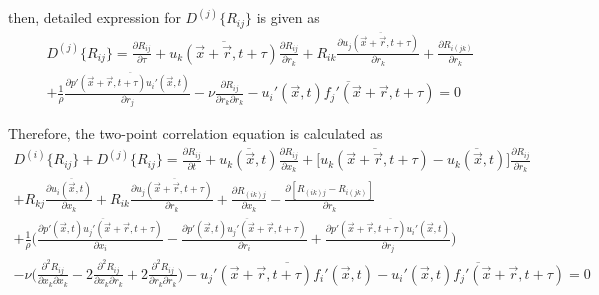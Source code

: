 \documentclass[paper=a4, fontsize=11pt]{scrartcl} %
\numberwithin{equation}{section} %
\numberwithin{figure}{section} %
\numberwithin{table}{section} %
\begin{document}
	 then, detailed expression for  $D^{(j)}\{R_{ij}\}$ is given as
	 \begin{equation}
		 \begin{aligned}
		 	D^{(j)}\{R_{ij}\} = \frac{\partial R_{ij}}{\partial \tau} + \overline{u_k(\vec{x} + \vec{r}, t + \tau)} \frac{\partial R_{ij}}{\partial r_k} + R_{ik} \frac{\partial \overline{u_j(\vec{x} + \vec{r}, t + \tau)}}{\partial r_k} + \frac{\partial R_{i(jk)}}{\partial r_k} \\
		 	+ \frac{1}{\rho}\frac{\partial \overline{p'(\vec{x} + \vec{r}, t + \tau)u_i'(\vec{x}, t)}}{\partial r_j} - \nu \frac{\partial R_{ij}}{\partial r_k \partial r_k} - \overline{u_i'(\vec{x}, t) f_j'(\vec{x} + \vec{r}, t + \tau)} = 0
		 \end{aligned}
	 \end{equation}
	 
	 Therefore, the two-point correlation equation is calculated as
	 \begin{equation}
	 	\begin{aligned}
	 		D^{(i)}\{R_{ij}\} + D^{(j)}\{R_{ij}\}
	 		= \frac{\partial R_{ij}}{\partial t}
	 		+ \overline{u_k(\vec{x}, t)} \frac{\partial R_{ij}}{\partial x_k}
	 		+ \Big[\overline{u_k(\vec{x} + \vec{r}, t + \tau)} - \overline{u_k(\vec{x}, t)}\Big]\frac{\partial R_{ij}}{\partial r_k}\\
	 		+ R_{kj}\frac{\partial \overline{u_i(\vec{x}, t)}}{\partial x_k} + R_{ik} \frac{\partial \overline{u_j(\vec{x} + \vec{r}, t + \tau)}}{\partial r_k} 
	 		 + \frac{\partial R_{(ik)j}}{\partial x_k} - \frac{\partial [R_{(ik)j}-R_{i(jk)}]}{\partial r_k}\\
	 		 + \frac{1}{\rho} \Bigg(\frac{\partial \overline{p'(\vec{x}, t) u_j'(\vec{x} + \vec{r}, t+\tau)}}{\partial x_i} - \frac{\partial \overline{p'(\vec{x}, t) u_j'(\vec{x} + \vec{r}, t+\tau)}}{\partial r_i} + \frac{\partial \overline{p'(\vec{x} + \vec{r}, t + \tau)u_i'(\vec{x}, t)}}{\partial r_j}\Bigg) \\ 
	 		 - \nu \Bigg(\frac{\partial^2 R_{ij}}{\partial x_k \partial x_k} - 2\frac{\partial^2 R_{ij}}{\partial x_k \partial r_k} + 2\frac{\partial^2 R_{ij}}{\partial r_k \partial r_k}\Bigg) - \overline{u_j'(\vec{x} + \vec{r}, t+\tau) f_i'(\vec{x}, t)}
	 		 - \overline{u_i'(\vec{x}, t) f_j'(\vec{x} + \vec{r}, t + \tau)} = 0
	 	\end{aligned}
	 \end{equation}
	 
\end{document}
